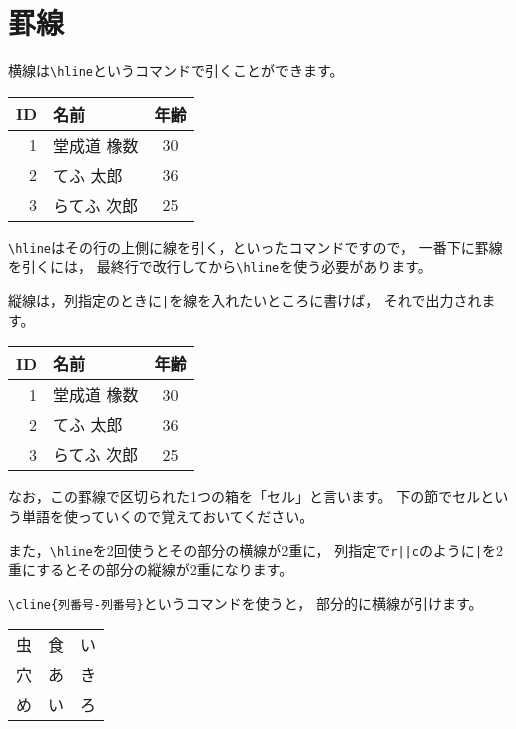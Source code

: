\documentclass[class=jreport, crop=false, preview=false, dvipdfmx, fleqn]{standalone}
\begin{document}
\section{罫線}
横線は\verb|\hline|というコマンドで引くことができます。

\begin{IOTeX}
\begin{tabular}{rlc} \hline
ID & 名前 & 年齢 \\ \hline
1 & 堂成道 橡数 & 30 \\ \hline
2 & てふ 太郎 & 36 \\ \hline
3 & らてふ 次郎 & 25 \\ \hline
\end{tabular}
\end{IOTeX}

\verb|\hline|はその行の上側に線を引く，といったコマンドですので，
一番下に罫線を引くには，
最終行で改行してから\verb|\hline|を使う必要があります。

縦線は，列指定のときに\verb!|!を線を入れたいところに書けば，
それで出力されます。

\begin{IOTeX}
\begin{tabular}{|r|l|c|} \hline
ID & 名前 & 年齢 \\ \hline
1 & 堂成道 橡数 & 30 \\ \hline
2 & てふ 太郎 & 36 \\ \hline
3 & らてふ 次郎 & 25 \\ \hline
\end{tabular}
\end{IOTeX}

なお，この罫線で区切られた1つの箱を「セル」と言います。
下の節でセルという単語を使っていくので覚えておいてください。

また，\verb|\hline|を2回使うとその部分の横線が2重に，
列指定で\verb!r||c!のように\verb!|!を2重にするとその部分の縦線が2重になります。

\verb|\cline{列番号-列番号}|というコマンドを使うと，
部分的に横線が引けます。

\begin{IOTeX}
\begin{tabular}{|ccc|} \hline
虫 & 食 & い \\ \cline{1-2}
穴 & あ & き \\ \cline{2-3}
め & い & ろ \\ \hline
\end{tabular}
\end{IOTeX}
\end{document}
